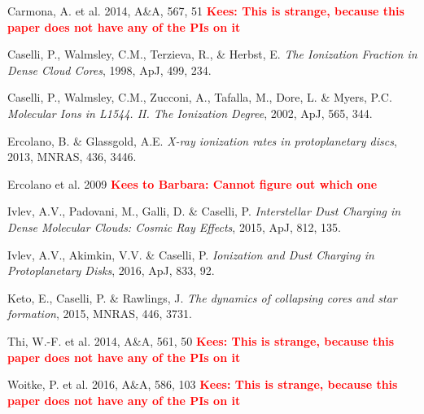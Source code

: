 \documentclass[10pt,fleqn,twoside]{article}
\makeatletter
\newcommand{\todo}[1]{\textcolor{red}{\bf #1}}
\newenvironment{literature}%
 {\begin{list}{}{%
   \setlength{\topsep}{0em}%
   \setlength{\parskip}{0em}%
   \setlength{\parsep}{0em}%
   \setlength{\itemsep}{0em}%
   \setlength{\rightmargin}{0em}%
   \setlength{\leftmargin}{2em}%
   \setlength{\itemindent}{-2em}}\normalfont\scriptsize}%
 {\end{list}}
\newcommand{\Tcol}{\color{blue}}
\renewcommand\paragraph{\@startsection{paragraph}{4}{\z@}%
            {-2.5ex\@plus -1ex \@minus -.25ex}%
            {1.25ex \@plus .25ex}%
            {\normalfont\normalsize\bfseries}}
\makeatother
\begin{document}
\begin{multicols}{2}
\begin{literature}
\item Carmona, A. et al. 2014, A\&A, 567, 51 \todo{Kees: This is strange, because
    this paper does not have any of the PIs on it}
\item Caselli, P., Walmsley, C.M., Terzieva, R., \& Herbst, E. {\em The
    Ionization Fraction in Dense Cloud Cores}, 1998, ApJ, 499, 234.
\item Caselli, P., Walmsley, C.M., Zucconi, A., Tafalla, M., Dore, L. \&
  Myers, P.C.  {\em Molecular Ions in L1544. II. The Ionization Degree},
  2002, ApJ, 565, 344.
\item Ercolano, B. \& Glassgold, A.E. {\em X-ray ionization rates in
    protoplanetary discs}, 2013, MNRAS, 436, 3446.
\item Ercolano et al. 2009 \todo{Kees to Barbara: Cannot figure out which one}
\item Ivlev, A.V., Padovani, M., Galli, D. \& Caselli, P. {\em Interstellar
    Dust Charging in Dense Molecular Clouds: Cosmic Ray Effects},
  2015, ApJ, 812, 135.
\item Ivlev, A.V., Akimkin, V.V. \& Caselli, P. {\em Ionization and Dust
    Charging in Protoplanetary Disks}, 2016, ApJ, 833, 92.
\item Keto, E., Caselli, P. \& Rawlings, J. {\em The dynamics of collapsing
    cores and star formation}, 2015, MNRAS, 446, 3731.
\item Thi, W.-F. et al. 2014, A\&A, 561, 50 \todo{Kees: This is strange,
    because this paper does not have any of the PIs on it}
\item Woitke, P. et al. 2016, A\&A, 586, 103 \todo{Kees: This is strange,
    because this paper does not have any of the PIs on it}
\end{literature}
\end{multicols}

% 
% 
% 
% 
% 
% 
% 
\end{document}
